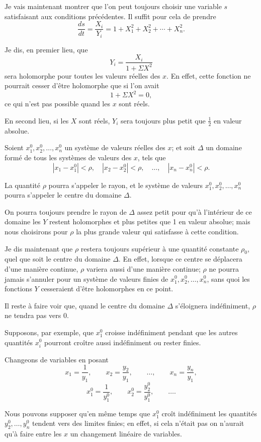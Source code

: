 \documentclass[11pt]{article}
\begin{document}
Je vais maintenant montrer que l’on peut toujours choisir une variable $s$ satisfaisant aux conditions précédentes. Il suffit pour cela de prendre
\[
\frac{ds}{dt}=\frac{X_i}{Y_i}=1+X_1^2+X_2^2+\cdots+X_n^2.
\]

Je dis, en premier lieu, que
\[
Y_i=\frac{X_i}{1+\Sigma X^2}
\]
sera holomorphe pour toutes les valeurs réelles des $x$. En effet, cette fonction ne pourrait cesser d’être holomorphe que si l’on avait
\[
1+\Sigma X^2=0,
\]
ce qui n’est pas possible quand les $x$ sont réels.

En second lieu, si les $X$ sont réels, $Y_i$ sera toujours plus petit que $\frac12$ en valeur absolue.

Soient $x_1^0,x_2^0,\ldots,x_n^0$ un système de valeurs réelles des $x$; et soit $\Delta$ un domaine formé de tous les systèmes de valeurs des $x$, tels que
\[
|x_1-x_1^0|<\rho,
\quad |x_2-x_2^0|<\rho,
\quad \ldots,
\quad |x_n-x_n^0|<\rho.
\]

La quantité $\rho$ pourra s’appeler le rayon, et le système de valeurs $x_1^0,x_2^0,\ldots,x_n^0$ pourra s’appeler le centre du domaine $\Delta$.

On pourra toujours prendre le rayon de $\Delta$ assez petit pour qu’à l’intérieur de ce domaine les $Y$ restent holomorphes et plus petites que 1 en valeur absolue; mais nous choisirons pour $\rho$ la plus grande valeur qui satisfasse à cette condition.

Je dis maintenant que $\rho$ restera toujours supérieur à une quantité constante $\rho_0$, quel que soit le centre du domaine $\Delta$. En effet, lorsque ce centre se déplacera d’une manière continue, $\rho$ variera aussi d’une manière continue; $\rho$ ne pourra jamais s’annuler pour un système de valeurs finies de $x_1^0,x_2^0,\ldots,x_n^0$, sans quoi les fonctions $Y$ cesseraient d’être holomorphes en ce point.

Il reste à faire voir que, quand le centre du domaine $\Delta$ s’éloignera indéfiniment, $\rho$ ne tendra pas vers 0.

Supposons, par exemple, que $x_1^0$ croisse indéfiniment pendant que les autres quantités $x_i^0$ pourront croître aussi indéfiniment ou rester finies.

Changeons de variables en posant
\[
x_1=\frac1{y_1},\qquad x_2=\frac{y_2}{y_1},\qquad \ldots,
\qquad x_n=\frac{y_n}{y_1},
\]
\[
x_1^0=\frac1{y_1^0},\qquad x_2^0=\frac{y_2^0}{y_1^0},\qquad \ldots.
\]

Nous pouvons supposer qu’en même temps que $x_1^0$ croît indéfiniment les quantités $y_2^0,\ldots,y_n^0$ tendent vers des limites finies; en effet, si cela n’était pas on n’aurait qu’à faire entre les $x$ un changement linéaire de variables.
\end{document}

